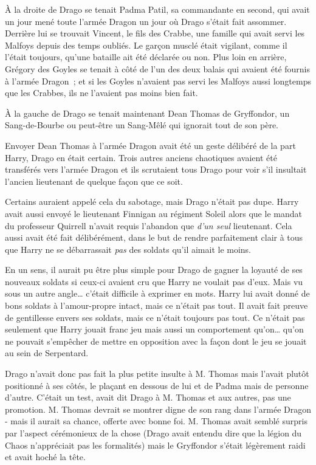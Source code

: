 À la droite de Drago se tenait Padma Patil, sa commandante en second, qui avait un jour mené toute l'armée Dragon un jour où Drago s'était fait assommer. Derrière lui se trouvait Vincent, le fils des Crabbe, une famille qui avait servi les Malfoys depuis des temps oubliés. Le garçon musclé était vigilant, comme il l'était toujours, qu'une bataille ait été déclarée ou non. Plus loin en arrière, Grégory des Goyles se tenait à côté de l'un des deux balais qui avaient été fournis à l'armée Dragon~; et si les Goyles n'avaient pas servi les Malfoys aussi longtemps que les Crabbes, ils ne l'avaient pas moins bien fait.

À la gauche de Drago se tenait maintenant Dean Thomas de Gryffondor, un Sang-de-Bourbe ou peut-être un Sang-Mêlé qui ignorait tout de son père.

Envoyer Dean Thomas à l'armée Dragon avait été un geste délibéré de la part Harry, Drago en était certain. Trois autres anciens chaotiques avaient été transférés vers l'armée Dragon et ils scrutaient tous Drago pour voir s'il insultait l'ancien lieutenant de quelque façon que ce soit.

Certains auraient appelé cela du sabotage, mais Drago n'était pas dupe. Harry avait aussi envoyé le lieutenant Finnigan au régiment Soleil alors que le mandat du professeur Quirrell n'avait requis l'abandon que \emph{d'un seul} lieutenant. Cela aussi avait été fait délibérément, dans le but de rendre parfaitement clair à tous que Harry ne se débarrassait \emph{pas} des soldats qu'il aimait le moins.

En un sens, il aurait pu être plus simple pour Drago de gagner la loyauté de ses nouveaux soldats si ceux-ci avaient cru que Harry ne voulait pas d'eux. Mais vu sous un autre angle… c'était difficile à exprimer en mots. Harry lui avait donné de bons soldats à l'amour-propre intact, mais ce n'était pas tout. Il avait fait preuve de gentillesse envers ses soldats, mais ce n'était toujours pas tout. Ce n'était pas seulement que Harry jouait franc jeu mais aussi un comportement qu'on… qu'on ne pouvait s'empêcher de mettre en opposition avec la façon dont le jeu se jouait au sein de Serpentard.

Drago n'avait donc pas fait la plus petite insulte à M. Thomas mais l'avait plutôt positionné à ses côtés, le plaçant en dessous de lui et de Padma mais de personne d'autre. C'était un test, avait dit Drago à M. Thomas et aux autres, pas une promotion. M. Thomas devrait se montrer digne de son rang dans l'armée Dragon - mais il aurait sa chance, offerte avec bonne foi. M. Thomas avait semblé surpris par l'aspect cérémonieux de la chose (Drago avait entendu dire que la légion du Chaos n'appréciait pas les formalités) mais le Gryffondor s'était légèrement raidi et avait hoché la tête.

